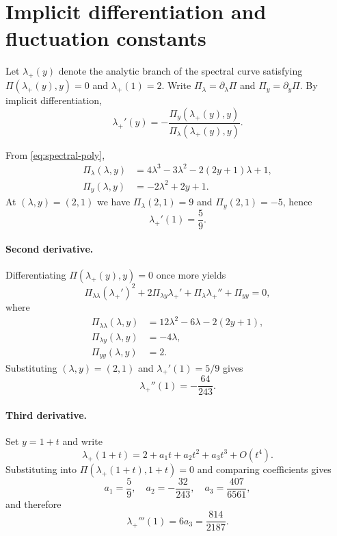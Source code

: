 \section{Implicit differentiation and fluctuation constants}\label{app:implicit}

Let \(\lambda_+(y)\) denote the analytic branch of the spectral curve satisfying
\(\Pi(\lambda_+(y),y)=0\) and \(\lambda_+(1)=2\).
Write \(\Pi_\lambda=\partial_\lambda \Pi\) and \(\Pi_y=\partial_y \Pi\).
By implicit differentiation,
\begin{equation}\label{eq:implicit-first}
\lambda_+'(y)=-\frac{\Pi_y(\lambda_+(y),y)}{\Pi_\lambda(\lambda_+(y),y)}.
\end{equation}

From \eqref{eq:spectral-poly},
\begin{align*}
\Pi_\lambda(\lambda,y) &= 4\lambda^3-3\lambda^2-2(2y+1)\lambda+1,\\
\Pi_y(\lambda,y) &= -2\lambda^2+2y+1.
\end{align*}
At \((\lambda,y)=(2,1)\) we have \(\Pi_\lambda(2,1)=9\) and \(\Pi_y(2,1)=-5\), hence
\[
\lambda_+'(1)=\frac{5}{9}.
\]

\paragraph{Second derivative.}
Differentiating \(\Pi(\lambda_+(y),y)=0\) once more yields
\[
\Pi_{\lambda\lambda}(\lambda_+')^2+2\Pi_{\lambda y}\lambda_+'+\Pi_\lambda\lambda_+''+\Pi_{yy}=0,
\]
where
\begin{align*}
\Pi_{\lambda\lambda}(\lambda,y) &= 12\lambda^2-6\lambda-2(2y+1),\\
\Pi_{\lambda y}(\lambda,y) &= -4\lambda,\\
\Pi_{yy}(\lambda,y) &= 2.
\end{align*}
Substituting \((\lambda,y)=(2,1)\) and \(\lambda_+'(1)=5/9\) gives
\[
\lambda_+''(1)=-\frac{64}{243}.
\]

\paragraph{Third derivative.}
Set \(y=1+t\) and write
\[
\lambda_+(1+t)=2+a_1t+a_2t^2+a_3t^3+O(t^4).
\]
Substituting into \(\Pi(\lambda_+(1+t),1+t)=0\) and comparing coefficients gives
\[
a_1=\frac{5}{9},\quad
a_2=-\frac{32}{243},\quad
a_3=\frac{407}{6561},
\]
and therefore
\[
\lambda_+'''(1)=6a_3=\frac{814}{2187}.
\]

